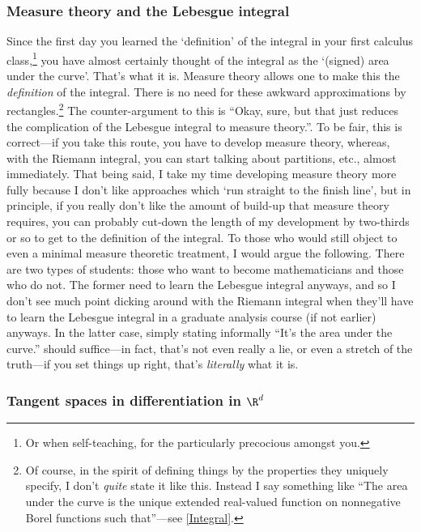 \subsubsection{Measure theory and the Lebesgue integral}

Since the first day you learned the `definition' of the integral in your first calculus class,\footnote{Or when self-teaching, for the particularly precocious amongst you.} you have almost certainly thought of the integral as the `(signed) area under the curve'.  That's what it is.  Measure theory allows one to make this the \emph{definition} of the integral.  There is no need for these awkward approximations by rectangles.\footnote{Of course, in the spirit of defining things by the properties they uniquely specify, I don't \emph{quite} state it like this.  Instead I say something like ``The area under the curve is the unique extended real-valued function on nonnegative Borel functions such that\textellipsis''---see \cref{Integral}.}  The counter-argument to this is ``Okay, sure, but that just reduces the complication of the Lebesgue integral to measure theory.''.  To be fair, this is correct---if you take this route, you have to develop measure theory, whereas, with the Riemann integral, you can start talking about partitions, etc., almost immediately.  That being said, I take my time developing measure theory more fully because I don't like approaches which `run straight to the finish line', but in principle, if you really don't like the amount of build-up that measure theory requires, you can probably cut-down the length of my development by two-thirds or so to get to the definition of the integral.  To those who would still object to even a minimal measure theoretic treatment, I would argue the following.  There are two types of students:  those who want to become mathematicians and those who do not.  The former need to learn the Lebesgue integral anyways, and so I don't see much point dicking around with the Riemann integral when they'll have to learn the Lebesgue integral in a graduate analysis course (if not earlier) anyways.  In the latter case, simply stating informally ``It's the area under the curve.'' should suffice---in fact, that's not even really a lie, or even a stretch of the truth---if you set things up right, that's \emph{literally} what it is.

\subsubsection{Tangent spaces in differentiation in \texorpdfstring{$\R ^d$}{Rd}}

